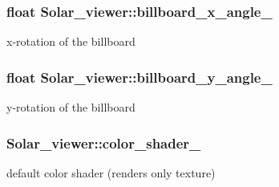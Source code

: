 \subsubsection[{\texorpdfstring{billboard\+\_\+x\+\_\+angle\+\_\+}{billboard_x_angle_}}]{\setlength{\rightskip}{0pt plus 5cm}float Solar\+\_\+viewer\+::billboard\+\_\+x\+\_\+angle\+\_\+\hspace{0.3cm}{\ttfamily [private]}}\hypertarget{classSolar__viewer_adf92f5eeae577e1178a4e8216abb87bb}{}\label{classSolar__viewer_adf92f5eeae577e1178a4e8216abb87bb}


x-\/rotation of the billboard 

\subsubsection[{\texorpdfstring{billboard\+\_\+y\+\_\+angle\+\_\+}{billboard_y_angle_}}]{\setlength{\rightskip}{0pt plus 5cm}float Solar\+\_\+viewer\+::billboard\+\_\+y\+\_\+angle\+\_\+\hspace{0.3cm}{\ttfamily [private]}}\hypertarget{classSolar__viewer_af91dd8490128e7b955fee3a166db7c3f}{}\label{classSolar__viewer_af91dd8490128e7b955fee3a166db7c3f}


y-\/rotation of the billboard 

\subsubsection[{\texorpdfstring{color\+\_\+shader\+\_\+}{color_shader_}}]{ Solar\+\_\+viewer\+::color\+\_\+shader\+\_\+\hspace{0.3cm}{\ttfamily [private]}}\hypertarget{classSolar__viewer_aed950d77f461e1ce32ba1dcf3898b814}{}\label{classSolar__viewer_aed950d77f461e1ce32ba1dcf3898b814}


default color shader (renders only texture) 

